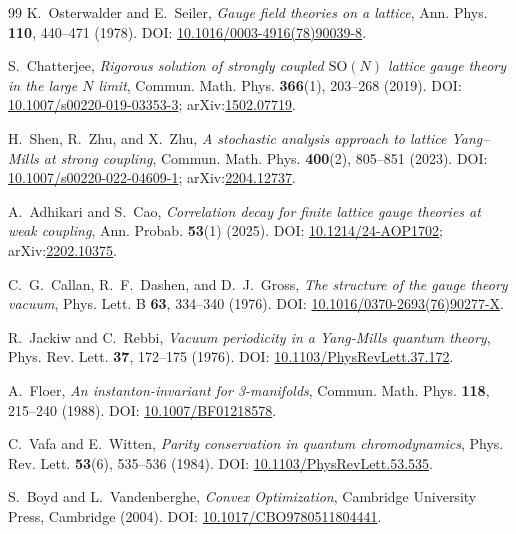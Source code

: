 \documentclass[11pt,a4paper]{amsart}
\theoremstyle{definition}
\begin{document}
\begin{thebibliography}{99}
K.~Osterwalder and E.~Seiler, \emph{Gauge field theories on a lattice}, Ann. Phys. \textbf{110}, 440--471 (1978). DOI: \href{https://doi.org/10.1016/0003-4916(78)90039-8}{10.1016/0003-4916(78)90039-8}.

S.~Chatterjee, \emph{Rigorous solution of strongly coupled $\mathrm{SO}(N)$ lattice gauge theory in the large $N$ limit}, Commun. Math. Phys. \textbf{366}(1), 203--268 (2019). DOI: \href{https://doi.org/10.1007/s00220-019-03353-3}{10.1007/s00220-019-03353-3}; arXiv:\href{https://arxiv.org/abs/1502.07719}{1502.07719}.

H.~Shen, R.~Zhu, and X.~Zhu, \emph{A stochastic analysis approach to lattice Yang--Mills at strong coupling}, Commun. Math. Phys. \textbf{400}(2), 805--851 (2023). DOI: \href{https://doi.org/10.1007/s00220-022-04609-1}{10.1007/s00220-022-04609-1}; arXiv:\href{https://arxiv.org/abs/2204.12737}{2204.12737}.

A.~Adhikari and S.~Cao, \emph{Correlation decay for finite lattice gauge theories at weak coupling}, Ann. Probab. \textbf{53}(1) (2025). DOI: \href{https://doi.org/10.1214/24-AOP1702}{10.1214/24-AOP1702}; arXiv:\href{https://arxiv.org/abs/2202.10375}{2202.10375}.

C.~G.~Callan, R.~F.~Dashen, and D.~J.~Gross, \emph{The structure of the gauge theory vacuum}, Phys. Lett. B \textbf{63}, 334--340 (1976). DOI: \href{https://doi.org/10.1016/0370-2693(76)90277-X}{10.1016/0370-2693(76)90277-X}.

R.~Jackiw and C.~Rebbi, \emph{Vacuum periodicity in a Yang-Mills quantum theory}, Phys. Rev. Lett. \textbf{37}, 172--175 (1976). DOI: \href{https://doi.org/10.1103/PhysRevLett.37.172}{10.1103/PhysRevLett.37.172}.

A.~Floer, \emph{An instanton-invariant for 3-manifolds}, Commun. Math. Phys. \textbf{118}, 215--240 (1988). DOI: \href{https://doi.org/10.1007/BF01218578}{10.1007/BF01218578}.

C.~Vafa and E.~Witten, \emph{Parity conservation in quantum chromodynamics}, Phys. Rev. Lett. \textbf{53}(6), 535--536 (1984). DOI: \href{https://doi.org/10.1103/PhysRevLett.53.535}{10.1103/PhysRevLett.53.535}.

S.~Boyd and L.~Vandenberghe, \emph{Convex Optimization}, Cambridge University Press, Cambridge (2004). DOI: \href{https://doi.org/10.1017/CBO9780511804441}{10.1017/CBO9780511804441}.


\end{thebibliography}
\end{document}
